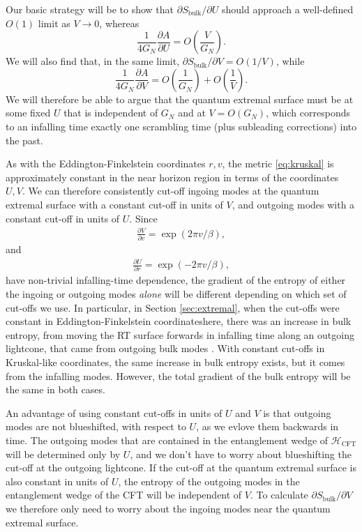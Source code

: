 \documentclass[12pt]{article}
\begin{document}
Our basic strategy will be to show that $\partial S_\text{bulk}/ \partial U$ should approach a well-defined $O(1)$ limit as $V \to 0$, whereas $$
\frac{1}{4G_N} \frac{\partial A}{ \partial U} = O\left(\frac{V}{ G_N}\right).
$$
We will also find that, in the same limit, $\partial S_\text{bulk}/ \partial V = O(1/V)$, while $$\frac{1}{4G_N}  \frac{\partial A}{ \partial V} = O\left(\frac{1}{G_N}\right) + O\left(\frac{1}{V}\right).$$ We will therefore be able to argue that the quantum extremal surface must be at some fixed $U$ that is independent of $G_N$ and at $V = O(G_N)$, which corresponds to an infalling time exactly one scrambling time (plus subleading corrections) into the past.

As with the Eddington-Finkelstein coordinates $r, v$, the metric \eqref{eq:kruskal} is approximately constant in the near horizon region in terms of the coordinates $U, V$. We can therefore consistently cut-off ingoing modes at the quantum extremal surface with a constant cut-off in units of $V$, and outgoing modes with a constant cut-off in units of $U$. Since
\begin{align} \label{eq:dVdv}
\frac{\partial V}{\partial v} =  \exp(2 \pi v /\beta),
\end{align}
and
\begin{align}
\frac{\partial U}{\partial r} = \exp(-2 \pi v /\beta),
\end{align}
have non-trivial infalling-time dependence, the gradient of the entropy of either the ingoing or outgoing modes \emph{alone} will be different depending on which set of cut-offs we use. In particular, in Section \ref{sec:extremal}, when the cut-offs were constant in Eddington-Finkelstein coordinateshere, there was an increase in bulk entropy, from moving the RT surface forwards in infalling time along an outgoing lightcone, that came from outgoing bulk modes . With constant cut-offs in Kruskal-like coordinates, the same increase in bulk entropy exists, but it comes from the infalling modes. However, the total gradient of the bulk entropy will be the same in both cases.

An advantage of using constant cut-offs in units of $U$ and $V$ is that outgoing modes are not blueshifted, with respect to $U$, as we evlove them backwards in time. The outgoing modes that are contained in the entanglement wedge of $\mathcal{H}_\text{CFT}$ will be determined only by $U$, and we don't have to worry about blueshifting the cut-off at the outgoing lightcone. If the cut-off at the quantum extremal surface is also constant in units of $U$, the entropy of the outgoing modes in the entanglement wedge of the CFT will be independent of $V$. To calculate $\partial S_\text{bulk}/\partial V$ we therefore only need to worry about the ingoing modes near the quantum extremal surface. 
\end{document}
